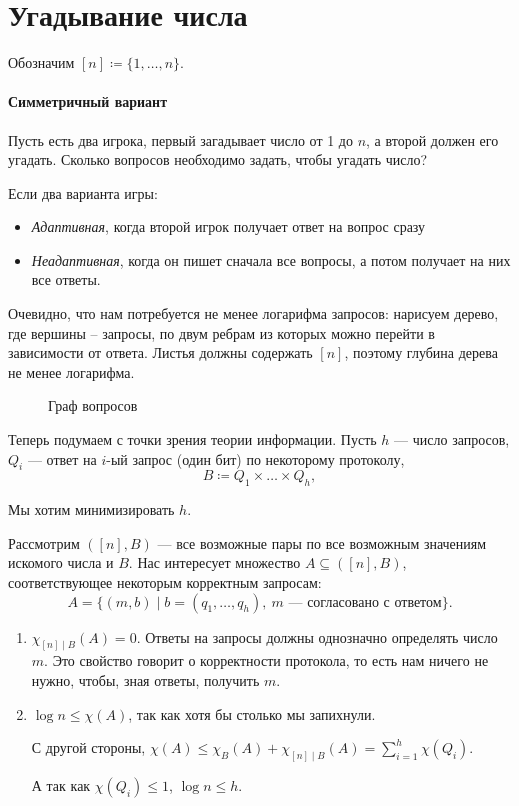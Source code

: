 \section{Угадывание числа}
Обозначим $ [n] \coloneqq \{1, \ldots , n\}$.
\paragraph{Симметричный вариант}
Пусть есть два игрока, первый загадывает число от 1 до $ n$, а второй должен его угадать. Сколько вопросов необходимо задать, чтобы угадать число?

Если два варианта игры:
\begin{itemize}
	\item \textit{Адаптивная}, когда второй игрок получает ответ на вопрос сразу
	\item \textit{Неадаптивная}, когда он пишет сначала все вопросы, а потом получает на них все ответы.
\end{itemize}
Очевидно, что нам потребуется не менее логарифма запросов: нарисуем дерево, где вершины -- запросы, по двум ребрам из которых  можно перейти в зависимости от ответа. Листья должны содержать $ [n]$, поэтому глубина дерева не менее логарифма.
\begin{figure}[ht]
    \centering
    \label{fig:graph-img}
	\caption{Граф вопросов}
\end{figure}

Теперь подумаем с точки зрения теории информации.
Пусть $ h$ --- число запросов, $ Q_i$ --- ответ на $ i$-ый запрос (один бит) по некоторому протоколу, 
$$ B \coloneqq Q_1 \times \ldots \times Q_h,$$ 

Мы хотим минимизировать $ h$.

Рассмотрим $ ([n], B)$ --- все возможные пары по все возможным значениям искомого числа и $ B$. 
Нас интересует множество  $ A \subseteq ([n], B)$, соответствующее некоторым корректным запросам:
\[
	A = \{(m, b) \mid b = (q_1, \ldots , q_h), ~ m \text{ --- согласовано с ответом}\}
.\] 

\begin{enumerate}
	\item $ \chi _{[n] \mid B}(A) = 0$. Ответы на запросы должны однозначно определять число $ m$. Это свойство говорит о корректности протокола, то есть нам ничего не нужно, чтобы, зная ответы, получить $ m$.
	\item $ \log n \le \chi(A)$, так как хотя бы столько мы запихнули. 

		С другой стороны, $ \chi(A) \le \chi_{B}(A) + \chi_{[n] \mid B}(A) = \sum_{i=1}^{h} \chi(Q_i)$. 

		А так как $ \chi(Q_i) \le 1$, $ \log n \le  h $.
\end{enumerate} 


